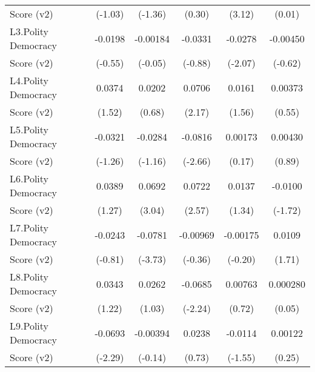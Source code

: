 {\begin{tabular}{l*{5}{c}}
Score (v2)          &     (-1.03)         &     (-1.36)         &      (0.30)         &      (3.12)         &      (0.01)         \\
[1em]
L3.Polity Democracy &     -0.0198         &    -0.00184         &     -0.0331         &     -0.0278\sym{*}  &    -0.00450         \\
Score (v2)          &     (-0.55)         &     (-0.05)         &     (-0.88)         &     (-2.07)         &     (-0.62)         \\
[1em]
L4.Polity Democracy &      0.0374         &      0.0202         &      0.0706\sym{*}  &      0.0161         &     0.00373         \\
Score (v2)          &      (1.52)         &      (0.68)         &      (2.17)         &      (1.56)         &      (0.55)         \\
[1em]
L5.Polity Democracy &     -0.0321         &     -0.0284         &     -0.0816\sym{**} &     0.00173         &     0.00430         \\
Score (v2)          &     (-1.26)         &     (-1.16)         &     (-2.66)         &      (0.17)         &      (0.89)         \\
[1em]
L6.Polity Democracy &      0.0389         &      0.0692\sym{**} &      0.0722\sym{*}  &      0.0137         &     -0.0100         \\
Score (v2)          &      (1.27)         &      (3.04)         &      (2.57)         &      (1.34)         &     (-1.72)         \\
[1em]
L7.Polity Democracy &     -0.0243         &     -0.0781\sym{***}&    -0.00969         &    -0.00175         &      0.0109         \\
Score (v2)          &     (-0.81)         &     (-3.73)         &     (-0.36)         &     (-0.20)         &      (1.71)         \\
[1em]
L8.Polity Democracy &      0.0343         &      0.0262         &     -0.0685\sym{*}  &     0.00763         &    0.000280         \\
Score (v2)          &      (1.22)         &      (1.03)         &     (-2.24)         &      (0.72)         &      (0.05)         \\
[1em]
L9.Polity Democracy &     -0.0693\sym{*}  &    -0.00394         &      0.0238         &     -0.0114         &     0.00122         \\
Score (v2)          &     (-2.29)         &     (-0.14)         &      (0.73)         &     (-1.55)         &      (0.25)         \\

\end{tabular}}
